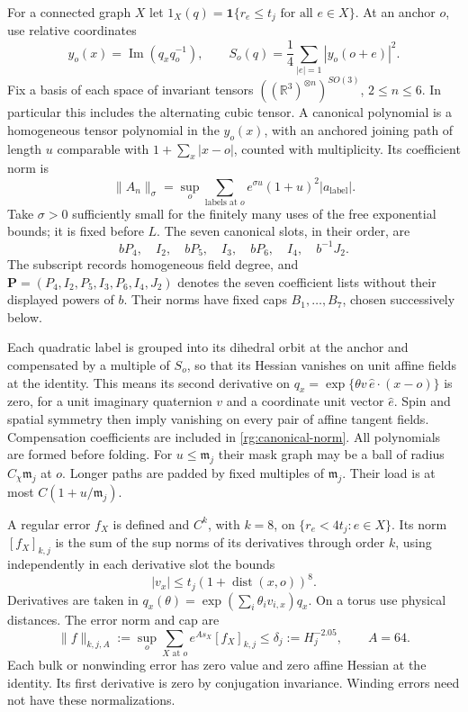 For a connected graph $X$ let
$1_X(q)=\mathbf1\{r_e\le t_j\text{ for all }e\in X\}$.
At an anchor $o$, use relative coordinates
\[
 y_o(x)=\operatorname{Im}(q_xq_o^{-1}),\qquad
 S_o(q)=\frac14\sum_{|e|=1}|y_o(o+e)|^2.
\]
Fix a basis of each space of invariant tensors
$((\mathbb R^3)^{\otimes n})^{SO(3)}$, $2\le n\le6$.
In particular this includes the alternating cubic tensor.  A canonical
polynomial is a homogeneous tensor polynomial in the $y_o(x)$, with an
anchored joining path of length $u$ comparable with
$1+\sum_x|x-o|$, counted with multiplicity.  Its coefficient norm is
\begin{equation}
 \|A_n\|_\sigma=
 \sup_o\sum_{\text{labels at }o}e^{\sigma u}(1+u)^2
                                  |a_{\text{label}}|.
 \label{rg:canonical-norm}
\end{equation}
Take $\sigma>0$ sufficiently small for the finitely many uses of the
free exponential bounds; it is fixed before $L$.  The seven canonical
slots, in their order, are
\begin{equation}
 bP_4,\quad I_2,\quad bP_5,\quad I_3,\quad
 bP_6,\quad I_4,\quad b^{-1}J_2.
 \label{rg:slots}
\end{equation}
The subscript records homogeneous field degree, and
$\mathbf P=(P_4,I_2,P_5,I_3,P_6,I_4,J_2)$ denotes the seven coefficient
lists without their displayed powers of $b$. Their norms have fixed caps
$B_1,\ldots,B_7$, chosen successively below.

Each quadratic label is grouped into its dihedral orbit at the anchor
and compensated by a multiple of $S_o$, so that its Hessian vanishes on
unit affine fields at the identity.  This means its second derivative
on $q_x=\exp\{\theta v\,\widehat e\cdot(x-o)\}$ is zero, for a unit
imaginary quaternion $v$ and a coordinate unit vector $\widehat e$.
Spin and spatial symmetry then imply vanishing on every pair of affine
tangent fields.  Compensation coefficients are included in
\eqref{rg:canonical-norm}.  All polynomials are formed before folding.
For $u\le \mathfrak m_j$ their mask graph may be a ball of radius
$C_\chi \mathfrak m_j$ at $o$.  Longer paths are padded by fixed multiples of
$\mathfrak m_j$.  Their load is at most $C(1+u/\mathfrak m_j)$.

A regular error $f_X$ is defined and $C^k$, with $k=8$, on
$\{r_e<4t_j:e\in X\}$.  Its norm $[f_X]_{k,j}$ is the sum of the sup
norms of its derivatives through order $k$, using independently in
each derivative slot the bounds
\begin{equation}
 |v_x|\le t_j(1+\operatorname{dist}(x,o))^8.
 \label{rg:directions}
\end{equation}
Derivatives are taken in
$q_x(\theta)=\exp(\sum_i\theta_iv_{i,x})q_x$.
On a torus use physical distances.  The error norm and cap are
\begin{equation}
 \|f\|_{k,j,A}:=\sup_o\sum_{X\text{ at }o}e^{As_X}[f_X]_{k,j}
       \le\delta_j:=H_j^{-2.05},\qquad A=64.
 \label{rg:error-norm}
\end{equation}
Each bulk or nonwinding error has zero value and zero affine Hessian
at the identity.  Its first derivative is zero by conjugation
invariance.  Winding errors need not have these normalizations.

